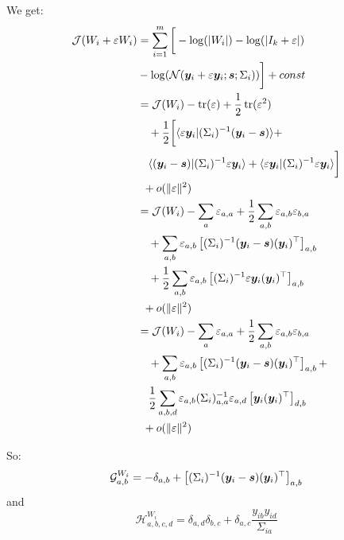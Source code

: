  We get:
 \begin{align}
   \mathcal{J}(W_i + \varepsilon W_i) &= \sum_{i=1}^m \bigg[ -\log(|W_i|) -\log(|I_k + \varepsilon|) \nonumber \\&- \log(\mathcal{N}(\boldsymbol{y}_i + \varepsilon \boldsymbol{y}_i; \boldsymbol{s}; \Sigma_i)) \bigg] + const \\
                                      &= \mathcal{J}(W_i) - \mathop{\mathrm{tr}}(\varepsilon) + \frac12 \mathop{\mathrm{tr}}(\varepsilon^2) \nonumber \\& \enspace \enspace + \frac12 \bigg[\langle \varepsilon \boldsymbol{y}_i| (\Sigma_i)^{-1} (\boldsymbol{y}_i - \boldsymbol{s}) \rangle + \nonumber \\& \enspace \enspace \langle (\boldsymbol{y}_i - \boldsymbol{s})| (\Sigma_i)^{-1} \varepsilon \boldsymbol{y}_i \rangle + \langle \varepsilon \boldsymbol{y}_i| (\Sigma_i)^{-1} \varepsilon \boldsymbol{y}_i \rangle \bigg] \nonumber \\ & \enspace + o(\|\varepsilon\|^2) \\
                                      &= \mathcal{J}(W_i) - \sum_a \varepsilon_{a, a} + \frac12 \sum_{a, b} \varepsilon_{a,b} \varepsilon_{b, a} \nonumber \\& \enspace \enspace + \sum_{a, b} \varepsilon_{a, b} \left[(\Sigma_i)^{-1}(\boldsymbol{y}_i - \boldsymbol{s}) (\boldsymbol{y}_i)^{\top} \right]_{a, b} \nonumber \\& \enspace \enspace + \frac12 \sum_{a, b} \varepsilon_{a, b} \left[(\Sigma_i)^{-1} \varepsilon \boldsymbol{y}_i (\boldsymbol{y}_i)^{\top}\right]_{a, b} \nonumber \\ & \enspace + o(\|\varepsilon\|^2) \\
                                      &= \mathcal{J}(W_i) - \sum_a \varepsilon_{a, a} + \frac12 \sum_{a, b} \varepsilon_{a,b} \varepsilon_{b, a} \nonumber \\& \enspace \enspace + \sum_{a, b} \varepsilon_{a, b} \left[(\Sigma_i)^{-1}(\boldsymbol{y}_i - \boldsymbol{s}) (\boldsymbol{y}_i)^{\top} \right]_{a, b} + \nonumber \\& \enspace \enspace \frac12 \sum_{a, b, d} \varepsilon_{a, b} (\Sigma_i)^{-1}_{a, a} \varepsilon_{a, d} \left[\boldsymbol{y}_i (\boldsymbol{y}_i)^{\top}\right]_{d, b} \nonumber \\ & \enspace + o(\|\varepsilon\|^2)
 \end{align}

 So:
 \begin{equation}
 \mathcal{G}^{W_i}_{a, b} =  -\delta_{a,b} + \left[(\Sigma_i)^{-1} (\boldsymbol{y}_i - \boldsymbol{s})(\boldsymbol{y}_i)^{\top}\right]_{a, b}
 \end{equation}
 and
 \begin{equation}
 \mathcal{H}^{W_i}_{a, b, c, d} = \delta_{a, d}\delta_{b, c} + \delta_{a, c} \frac{y_{ib} y_{id}}{\Sigma_{ia}}
 \end{equation}
 
